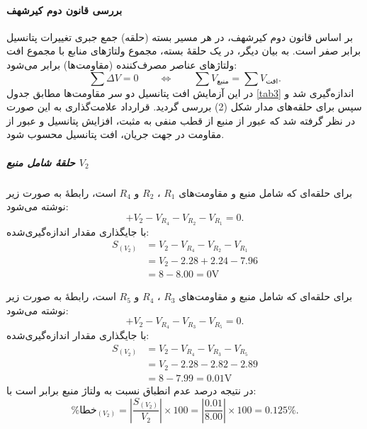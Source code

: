 \documentclass[a4paper, 11pt]{article}
\begin{document}
\paragraph{بررسی قانون دوم کیرشهف }

بر اساس قانون دوم کیرشهف، در هر مسیر بسته (حلقه) جمع جبری تغییرات پتانسیل برابر صفر است. به بیان دیگر، در یک حلقهٔ بسته، مجموع ولتاژهای منابع با مجموع افت ولتاژهای عناصر مصرف‌کننده (مقاومت‌ها) برابر می‌شود:
\begin{equation}
\sum \Delta V = 0 
\qquad \Longleftrightarrow \qquad
\sum V_{\text{منبع}} = \sum V_{\text{افت}}.
\end{equation}
در این آزمایش افت پتانسیل دو سر مقاومت‌ها مطابق جدول \ref{tab3} اندازه‌گیری شد و سپس  برای حلقه‌های مدار شکل (2) بررسی گردید. قرارداد علامت‌گذاری به این صورت در نظر گرفته شد که عبور از منبع از قطب منفی به مثبت، افزایش پتانسیل  و عبور از مقاومت در جهت جریان، افت پتانسیل  محسوب شود.

\subparagraph{حلقهٔ شامل منبع \texorpdfstring{$V_2$}{V2}}
برای حلقه‌ای که شامل منبع  و مقاومت‌های $R_1$ ، $R_2$ و $R_4$ است، رابطهٔ  به صورت زیر نوشته می‌شود:
\begin{equation}
+V_2 - V_{R_4} - V_{R_2} - V_{R_1} = 0.
\end{equation}
با جایگذاری مقدار اندازه‌گیری‌شده:
\begin{align}
S_{(V_2)} &= V_2 - V_{R_4} - V_{R_2} - V_{R_1}\nonumber\\
&= V_2 - 2.28 + 2.24 -7.96 \nonumber\\
&= 8 - 8.00 = 0 \mathrm{V}
\end{align}


برای حلقه‌ای که شامل منبع  و مقاومت‌های $R_3$ ، $R_4$ و $R_5$ است، رابطهٔ  به صورت زیر نوشته می‌شود:
\begin{equation}
+V_2 - V_{R_4} - V_{R_3} - V_{R_5} = 0.
\end{equation}
با جایگذاری مقدار اندازه‌گیری‌شده:
\begin{align}
S_{(V_2)} &= V_2 - V_{R_4} - V_{R_3} - V_{R_5}\nonumber\\
&= V_2 - 2.28 - 2.82 - 2.89\nonumber\\
&= 8 - 7.99 = 0.01 \mathrm{V}
\end{align}
در نتیجه درصد عدم انطباق نسبت به ولتاژ منبع  برابر است با:
\begin{equation}
\%\text{خطا}_{(V_2)}=
\left|\frac{S_{(V_2)}}{V_2}\right|\times 100
=
\left|\frac{0.01}{8.00}\right|\times 100
= 0.125\%.
\end{equation}
\end{document}
